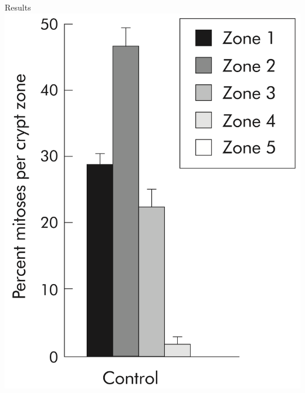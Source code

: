 \documentclass[t,xcolor={usenames,dvipsnames}]{beamer}
\begin{document}
\begin{frame}{Results}
\includegraphics[height=.4\textheight]{WongFigure}
\end{frame}
\end{document}
